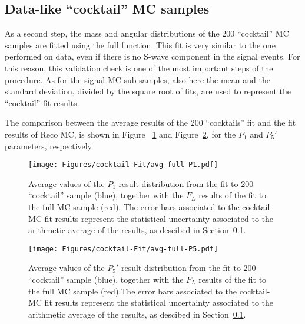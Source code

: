 \subsection{Data-like ``cocktail'' MC samples}
\label{sec:Cocktail-MC-full}

As a second step, the mass and angular distributions of the 200 ``cocktail'' MC samples are fitted using the full \pdf function.
This fit is very similar to the one performed on data, even if there is no S-wave component in the signal events.
For this reason, this validation check is one of the most important steps of the procedure.
As for the signal MC sub-samples, also here the mean and the standard deviation, divided by the square root of fits, are used to represent the ``cocktail'' fit results.

The comparison between the average results of the 200 ``cocktails'' fit and the fit results of Reco MC, is shown in Figure ~\ref{fig:closure-full-cocktail-p1} and Figure~\ref{fig:closure-full-cocktail-P5'}, for the $P_1$ and $P_5'$  parameters, respectively.


\begin{figure}[!hbt]
  \centering
  \texttt{[image: Figures/cocktail-Fit/avg-full-P1.pdf]}
  \caption{Average values of the $P_1$ result distribution from the fit to 200 ``cocktail'' sample (blue), together with the $F_L$ results of the fit to the full MC sample (red). The error bars associated to the cocktail-MC fit results represent the statistical uncertainty associated to the arithmetic average of the results, as descibed in Section~\ref{sec:Cocktail-MC-full}.}
  \label{fig:closure-full-cocktail-p1}
\end{figure}

\begin{figure}[!hbt]
  \centering
  \texttt{[image: Figures/cocktail-Fit/avg-full-P5.pdf]}
  \caption{Average values of the $P_5'$ result distribution from the fit to 200 ``cocktail'' sample (blue), together with the $F_L$ results of the fit to the full MC sample (red).The error bars associated to the cocktail-MC fit results represent the statistical uncertainty associated to the arithmetic average of the results, as descibed in Section~\ref{sec:Cocktail-MC-full}.}
  \label{fig:closure-full-cocktail-P5'}
\end{figure}



